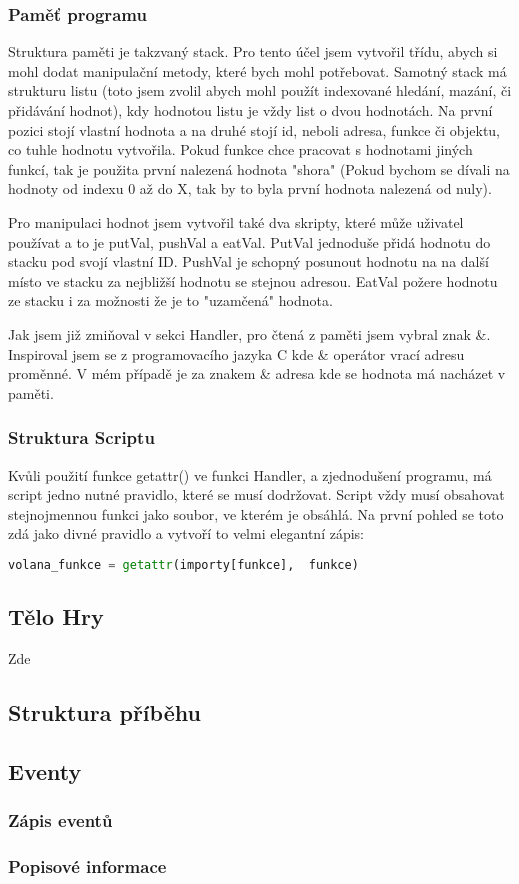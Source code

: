 \documentclass[12pt,a4paper]{article}
\begin{document}
\subsubsection{Paměť programu}
Struktura paměti je takzvaný stack. Pro tento účel jsem vytvořil třídu, abych si mohl dodat manipulační metody, které bych mohl potřebovat. Samotný stack má strukturu listu (toto jsem zvolil abych mohl použít indexované hledání, mazání, či přidávání hodnot), kdy hodnotou listu je vždy list o dvou hodnotách. Na první pozici stojí vlastní hodnota a na druhé stojí id, neboli adresa, funkce či objektu, co tuhle hodnotu vytvořila. Pokud funkce chce pracovat s hodnotami jiných funkcí, tak je použita první nalezená hodnota "shora" (Pokud bychom se dívali na hodnoty od indexu 0 až do X, tak by to byla první hodnota nalezená od nuly).

Pro manipulaci hodnot jsem vytvořil také dva skripty, které může uživatel používat a to je putVal, pushVal a eatVal. PutVal jednoduše přidá hodnotu do stacku pod svojí vlastní ID. PushVal je schopný posunout hodnotu na na další místo ve stacku za nejbližší hodnotu se stejnou adresou. EatVal požere hodnotu ze stacku i za možnosti že je to "uzamčená" hodnota.

Jak jsem již zmiňoval v sekci Handler, pro čtená z paměti jsem vybral znak \&. Inspiroval jsem se z programovacího jazyka C kde \& operátor vrací adresu proměnné. V mém případě je za znakem \& adresa kde se hodnota má nacházet v paměti.

\subsubsection{Struktura Scriptu}
Kvůli použití funkce getattr() ve funkci Handler, a zjednodušení programu, má script jedno nutné
pravidlo, které se musí dodržovat. Script vždy musí obsahovat stejnojmennou funkci jako soubor, ve kterém je obsáhlá. Na první pohled se toto zdá jako divné pravidlo a vytvoří to velmi elegantní zápis: 
\begin{lstlisting}[language=Python] 
volana_funkce = getattr(importy[funkce],  funkce) 
\end{lstlisting}
\subsection{Tělo Hry}
Zde 
\subsection{Struktura příběhu}
\subsection{Eventy}
\subsubsection{Zápis eventů}
\subsubsection{Popisové informace}
\end{document}
